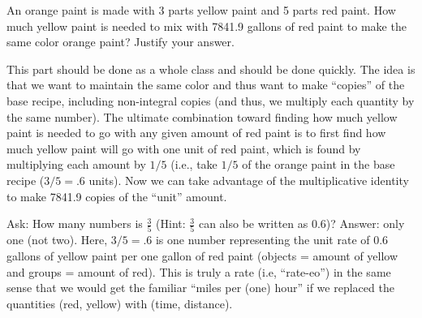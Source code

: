 \documentclass[nooutcomes, handout]{ximera}
\begin{document}
\begin{question}
 An orange paint is made with 3 parts yellow paint and 5 parts red paint.  How much yellow paint is needed to mix with 7841.9 gallons of red paint to make the same color orange paint?  Justify your answer.


\begin{instructorNotes}
This part should be done as a whole class and should be done quickly.  The idea is that we want to maintain the same color and thus want to make ``copies'' of the base recipe, including non-integral copies (and thus, we multiply each quantity by the same number).  The ultimate combination toward finding how much yellow paint is needed to go with any given amount of red paint is to first find how much yellow paint will go with one unit of red paint, which is found by multiplying each amount by $1/5$ (i.e., take $1/5$ of the orange paint in the base recipe ($3/5 = .6$ units).  Now we can take advantage of the multiplicative identity to make 7841.9 copies of the ``unit'' amount.

    Ask: How many numbers is $\frac{3}{5}$ (Hint:  $\frac{3}{5}$ can also be written as 0.6)? Answer: only one (not two).  Here, $3/5 = .6$ is one number representing the unit rate of 0.6 gallons of yellow paint per one gallon of red paint (objects = amount of yellow and groups = amount of red).  This is truly a rate (i.e, ``rate-eo'') in the same sense that we would get the familiar ``miles per (one) hour'' if we replaced the quantities (red, yellow) with (time, distance).
\end{instructorNotes}
\end{question}
 
\end{document}
